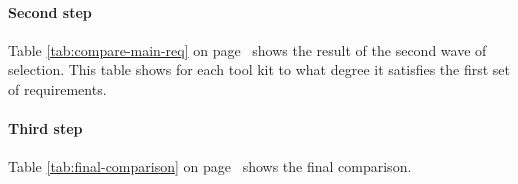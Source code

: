 \paragraph{Second step} Table \ref{tab:compare-main-req} on
page~\pageref{tab:compare-main-req} shows the result of the second wave of
selection. This table shows for each tool kit to what degree it satisfies the
first set of requirements. 

\paragraph{Third step} Table \ref{tab:final-comparison} on
page~\pageref{tab:final-comparison} shows the final comparison. 
